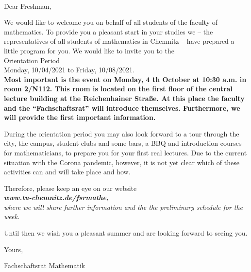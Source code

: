\documentclass[nkz,einrichtung,usemycontact]{tucletter2019}
\begin{document}
	
\begin{letter}{%
\, \\
}

\opening{Dear Freshman,}

We would like to welcome you on behalf of all students of the faculty of mathematics. To provide you a pleasant start in your studies we – the representatives of all students of mathematics in Chemnitz – have prepared a little program for you. We would like to invite you to the\\[12pt]

\hspace*{\fill} \Large Orientation Period \hspace*{\fill} \\
\hspace*{\fill} Monday, 10/04/2021 to Friday, 10/08/2021. \normalsize \hspace*{\fill} \\[16pt]

\bfseries Most important is the event on Monday, 4 th October at 10:30 a.m. in room 2/N112. This room is located on the first floor of the central lecture building at the Reichenhainer Straße. At this place the faculty and the “Fachschaftsrat” will introduce themselves. Furthermore, we will provide the first important information.\mdseries

\medskip

During the orientation period you may also look forward to a tour through the city, the campus, student clubs and some bars, a BBQ and introduction courses for mathematicians, to prepare you for your first real lectures. Due to the current situation with the Corona pandemic, however, it is not yet clear which of these activities can and will take place and how.

\medskip

Therefore, please keep an eye on our website\\[8pt]
\hspace*{\fill} \itshape\textbf{www.tu-chemnitz.de/fsrmathe,} \upshape \hspace*{\fill} \\[8pt]
where we will share further information and the the preliminary schedule for the week.

\medskip

Until then we wish you a pleasant summer and are looking forward to seeing you.

\medskip

Yours,

Fachschaftsrat Mathematik

\end{letter}
\end{document}
